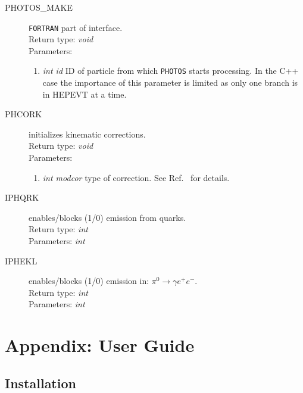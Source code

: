 \documentclass[]{Photos_interface_design}
\begin{document}
\begin{description}
\item[PHOTOS\_MAKE] {\tt FORTRAN} part of interface. \\
  Return type: \textit{void} \\
  Parameters:
  \begin{enumerate}
    \item \textit {int id} ID of particle from which {\tt PHOTOS} starts processing. In the C++ case the importance of this parameter is limited as only one branch is in HEPEVT at a time.
  \end{enumerate}
\end{description}

\begin{description}
\item[PHCORK] initializes kinematic corrections. \\
  Return type: \textit{void} \\
  Parameters:
  \begin{enumerate}
    \item \textit {int modcor} type of correction. See Ref.~\cite{Golonka:2005pn}  for details.
  \end{enumerate}
\end{description}


\begin{description}
\item[IPHQRK] enables/blocks (1/0) emission from quarks. \\
  Return type: \textit{int} \\
  Parameters: \textit{int}
\end{description}

\begin{description}
\item[IPHEKL] enables/blocks (1/0) emission in: $\pi^0 \rightarrow \gamma e^+ e^-$. \\
  Return type: \textit{int} \\
  Parameters: \textit{int}
\end{description}

\section{Appendix: User Guide}
\label{sec:User Guide}

\subsection{Installation}
\label{sec:Installation}
 
\end{document}
